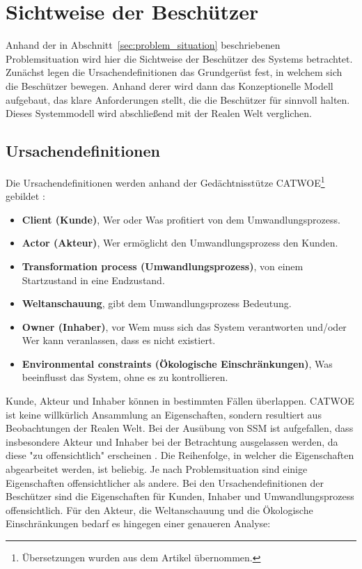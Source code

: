 \documentclass[11pt,a4paper]{report}
\begin{document}
\section{Sichtweise der Beschützer} 

Anhand der in Abschnitt~\ref{sec:problem_situation} beschriebenen Problemsituation wird hier die Sichtweise der Beschützer des Systems betrachtet. Zunächst legen die Ursachendefinitionen das Grundgerüst fest, in welchem sich die Beschützer bewegen. Anhand derer wird dann das Konzeptionelle Modell aufgebaut, das klare Anforderungen stellt, die die Beschützer für sinnvoll halten. Dieses Systemmodell wird abschließend mit der Realen Welt verglichen.

\subsection{Ursachendefinitionen}

Die Ursachendefinitionen werden anhand der Gedächtnisstütze CATWOE\footnote{Übersetzungen wurden aus dem Artikel \cite{ssmger} übernommen.} gebildet \cite{bobwill}:

\begin{itemize}[leftmargin=*]
\item \textbf{Client (Kunde)}, Wer oder Was profitiert von dem Umwandlungsprozess.
\item \textbf{Actor (Akteur)}, Wer ermöglicht den Umwandlungsprozess den Kunden.
\item \textbf{Transformation process (Umwandlungsprozess)}, von einem Startzustand in eine Endzustand.
\item \textbf{Weltanschauung}, gibt dem Umwandlungsprozess Bedeutung.
\item \textbf{Owner (Inhaber)}, vor Wem muss sich das System verantworten und/oder Wer kann veranlassen, dass es nicht existiert.
\item \textbf{Environmental constraints (Ökologische Einschränkungen)}, Was beeinflusst das System, ohne es zu kontrollieren.
\end{itemize}

Kunde, Akteur und Inhaber können in bestimmten Fällen überlappen. CATWOE ist keine willkürlich Ansammlung an Eigenschaften, sondern resultiert aus Beobachtungen der Realen Welt. Bei der Ausübung von SSM ist aufgefallen, dass insbesondere Akteur und Inhaber bei der Betrachtung ausgelassen werden, da diese "zu offensichtlich" erscheinen \cite{gutmann7}. Die Reihenfolge, in welcher die Eigenschaften abgearbeitet werden, ist beliebig. Je nach Problemsituation sind einige Eigenschaften offensichtlicher als andere. Bei den Ursachendefinitionen der Beschützer sind die Eigenschaften für Kunden, Inhaber und Umwandlungsprozess offensichtlich. Für den Akteur, die Weltanschauung und die Ökologische Einschränkungen bedarf es hingegen einer genaueren Analyse:
\end{document}
